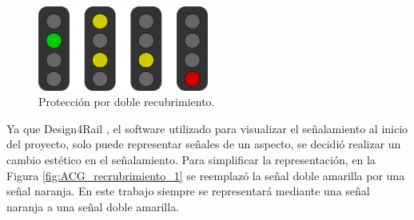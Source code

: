 	\begin{figure}[!h]
		\centering
		\includegraphics[width=0.5\textwidth]{Figuras/semaforo2}
		\centering\caption{Protección por doble recubrimiento.}
		\label{fig:uk_signalling}
	\end{figure}
	
	Ya que Design4Rail \cite{DESIGN4RAIL}, el software utilizado para visualizar el señalamiento al inicio del proyecto, solo puede representar señales de un aspecto, se decidió realizar un cambio estético en el señalamiento. Para simplificar la representación, en la Figura \ref{fig:ACG_recrubrimiento_1} se reemplazó la señal doble amarilla por una señal naranja. En este trabajo siempre se representará mediante una señal naranja a una señal doble amarilla.

	
	